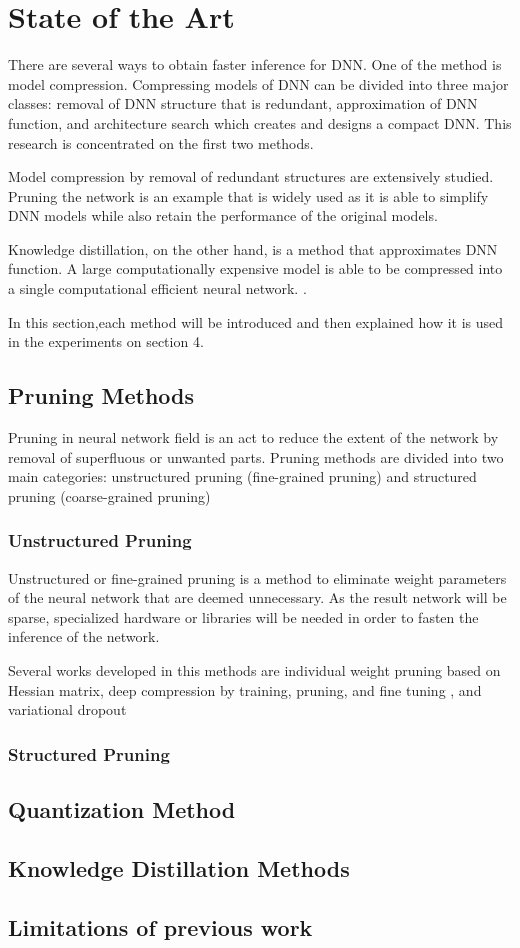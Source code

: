 

    \chapter{State of the Art}
	There are several ways to obtain faster inference for DNN. One of the method is model compression. Compressing models of DNN can be divided into three major classes: \cite{Wen2017LearningIS} removal of DNN structure that is redundant, approximation of DNN function, and architecture search which creates and designs a compact DNN. This research is concentrated on the first two methods.
	
	Model compression by removal of redundant structures are extensively studied. Pruning the network is an example that is widely used as it is able to simplify DNN models while also retain the performance of the original models. \cite{Tang2019BringingGN}
	
	Knowledge distillation, on the other hand, is a method that approximates DNN function. A large computationally expensive model is able to be compressed into a single computational efficient neural network. \cite{Mirzadeh2019ImprovedKD}.
	
	In this section,each method will be introduced and then explained how it is used in the experiments on section 4. 
	
    \section{Pruning Methods}
    Pruning in neural network field is an act to reduce the extent of the network by removal of superfluous or unwanted parts. Pruning methods are divided into two main categories: unstructured pruning (fine-grained pruning) and structured pruning (coarse-grained pruning) \cite{8114708}
    
    \subsection{Unstructured Pruning}
    Unstructured or fine-grained pruning is a method to eliminate weight parameters of the neural network that are deemed unnecessary. As the result network will be sparse, specialized hardware or libraries will be needed in order to fasten the inference of the network.\cite{Liu2018RethinkingTV} 
    
    Several works developed in this methods are individual weight pruning based on Hessian matrix, \cite{NIPS1992_647} deep compression by training, pruning, and fine tuning \cite{Han2015DeepCC}, and variational dropout \cite{Molchanov2017VariationalDS}
    
    \subsection{Structured Pruning}
    
    \section{Quantization Method}
    \section{Knowledge Distillation Methods}
    \section{Limitations of previous work}

